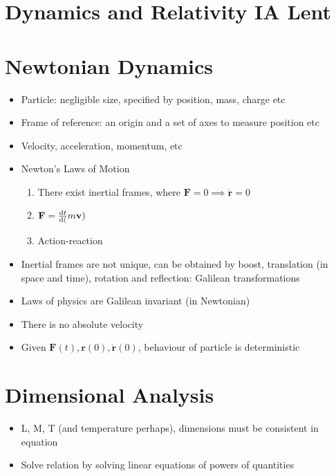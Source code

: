 


\section*{Dynamics and Relativity \hfill IA Lent}

\section{Newtonian Dynamics}
\begin{itemize}
      \item Particle: negligible size, specified by position, mass, charge etc
      \item Frame of reference: an origin and a set of axes to measure position etc
      \item Velocity, acceleration, momentum, etc
      \item Newton's Laws of Motion
            \begin{enumerate}
                  \item There exist inertial frames, where $\mathbf{F} = 0 \implies \mathbf{\ddot{r}} = 0$
                  \item $\mathbf{F} = \frac{\mathrm{d}{t}}{\mathrm{d}{(}}m\mathbf{v})$
                  \item Action-reaction
            \end{enumerate}
      \item Inertial frames are not unique, can be obtained by boost, translation (in space and time), rotation and reflection: Galilean transformations
      \item Laws of physics are Galilean invariant (in Newtonian)
      \item There is no absolute velocity
      \item Given $\mathbf{F}(t), \mathbf{r}(0), \mathbf{\dot{r}}(0)$, behaviour of particle is deterministic

\end{itemize}

\section{Dimensional Analysis}
\begin{itemize}
      \item L, M, T (and temperature perhaps), dimensions must be consistent in equation
      \item Solve relation by solving linear equations of powers of quantities
\end{itemize}

